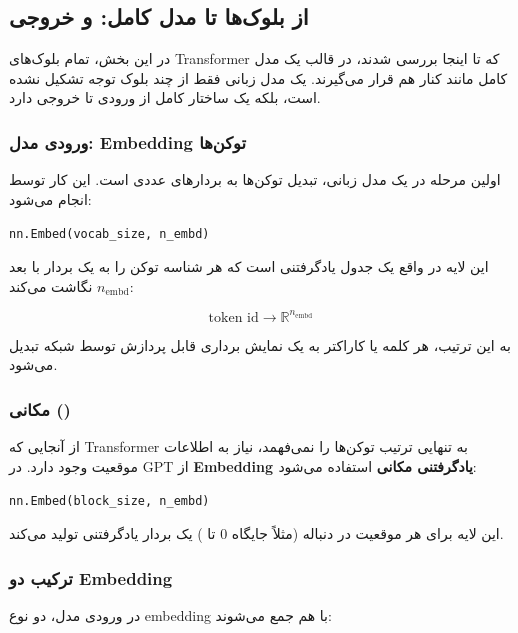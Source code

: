\documentclass{article}
\begin{document}
\subsection{از بلوک‌ها تا مدل کامل:  و  خروجی}

در این بخش، تمام بلوک‌های Transformer که تا اینجا بررسی شدند، در قالب یک مدل کامل مانند  کنار هم قرار می‌گیرند. یک مدل زبانی فقط از چند بلوک توجه تشکیل نشده است، بلکه یک ساختار کامل از ورودی تا خروجی دارد.

\subsubsection*{ورودی مدل: Embedding توکن‌ها}

اولین مرحله در یک مدل زبانی، تبدیل توکن‌ها به بردارهای عددی است. این کار توسط  انجام می‌شود:

\begin{latin}
	\texttt{nn.Embed(vocab\_size, n\_embd)}
\end{latin}

این لایه در واقع یک جدول یادگرفتنی است که هر شناسه توکن را به یک بردار با بعد \( n_{\text{embd}} \) نگاشت می‌کند:

\[
\text{token id} \rightarrow \mathbb{R}^{n_{\text{embd}}}
\]

به این ترتیب، هر کلمه یا کاراکتر به یک نمایش برداری قابل پردازش توسط شبکه تبدیل می‌شود.

\subsubsection*{ مکانی ()}

از آنجایی که Transformer به تنهایی ترتیب توکن‌ها را نمی‌فهمد، نیاز به اطلاعات موقعیت وجود دارد. در GPT از \textbf{Embedding یادگرفتنی مکانی} استفاده می‌شود:

\begin{latin}
	\texttt{nn.Embed(block\_size, n\_embd)}
\end{latin}

این لایه برای هر موقعیت در دنباله (مثلاً جایگاه 0 تا ) یک بردار یادگرفتنی تولید می‌کند.

\subsubsection*{ترکیب دو Embedding}

در ورودی مدل، دو نوع embedding با هم جمع می‌شوند:
\end{document}

